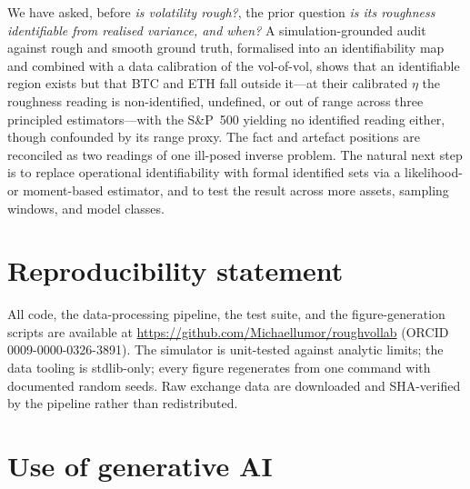 \documentclass[11pt]{article}
\begin{document}
We have asked, before \emph{is volatility rough?}, the prior question \emph{is its
roughness identifiable from realised variance, and when?} A simulation-grounded
audit against rough and smooth ground truth, formalised into an identifiability map
and combined with a data calibration of the vol-of-vol, shows that an identifiable
region exists but that BTC and ETH fall outside it---at their calibrated $\eta$ the
roughness reading is non-identified, undefined, or out of range across three
principled estimators---with the S\&P~500 yielding no identified reading either,
though confounded by its range proxy. The fact and artefact positions are reconciled
as two readings of one ill-posed inverse problem. The natural next step is to replace
operational identifiability with formal identified sets via a likelihood- or
moment-based estimator, and to test the result across more assets, sampling windows,
and model classes.

\section*{Reproducibility statement}

All code, the data-processing pipeline, the test suite, and the figure-generation
scripts are available at \url{https://github.com/Michaellumor/roughvollab}
(ORCID 0009-0000-0326-3891). The simulator is unit-tested against analytic limits;
the data tooling is stdlib-only; every figure regenerates from one command with
documented random seeds. Raw exchange data are downloaded and SHA-verified by the
pipeline rather than redistributed.

\section*{Use of generative AI}
\end{document}
